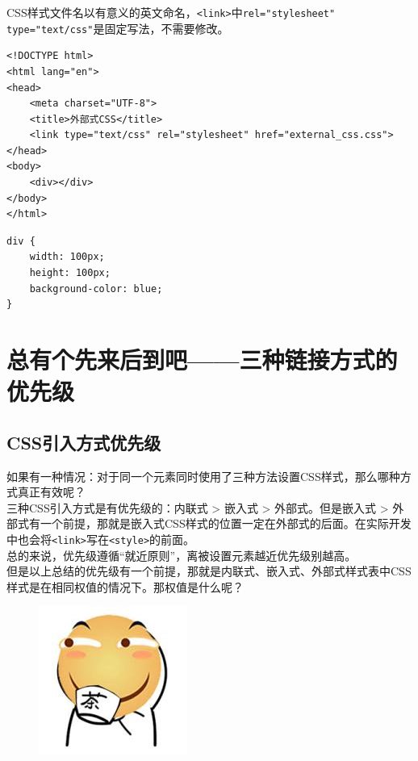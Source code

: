 CSS样式文件名以有意义的英文命名，\lstinline|<link>|中\lstinline|rel="stylesheet" type="text/css"|是固定写法，不需要修改。

\begin{lstlisting}[style=htmlcssjs, title=external\_css.html]
<!DOCTYPE html>
<html lang="en">
<head>
    <meta charset="UTF-8">
    <title>外部式CSS</title>
    <link type="text/css" rel="stylesheet" href="external_css.css">
</head>
<body>
    <div></div>
</body>
</html>
\end{lstlisting}

\begin{lstlisting}[style=htmlcssjs, title=external\_css.css]
div {
    width: 100px;
    height: 100px;
    background-color: blue;
}
\end{lstlisting}

\newpage

\section{总有个先来后到吧——三种链接方式的优先级}

\subsection{CSS引入方式优先级}

如果有一种情况：对于同一个元素同时使用了三种方法设置CSS样式，那么哪种方式真正有效呢？ \\

三种CSS引入方式是有优先级的：内联式 > 嵌入式 > 外部式。但是嵌入式 > 外部式有一个前提，那就是嵌入式CSS样式的位置一定在外部式的后面。在实际开发中也会将\lstinline|<link>|写在\lstinline|<style>|的前面。 \\

总的来说，优先级遵循“就近原则”，离被设置元素越近优先级别越高。 \\

但是以上总结的优先级有一个前提，那就是内联式、嵌入式、外部式样式表中CSS样式是在相同权值的情况下。那权值是什么呢？

\begin{figure}[H]
    \centering
    \includegraphics[]{img/C5/5-5/1.png}
\end{figure}

\newpage